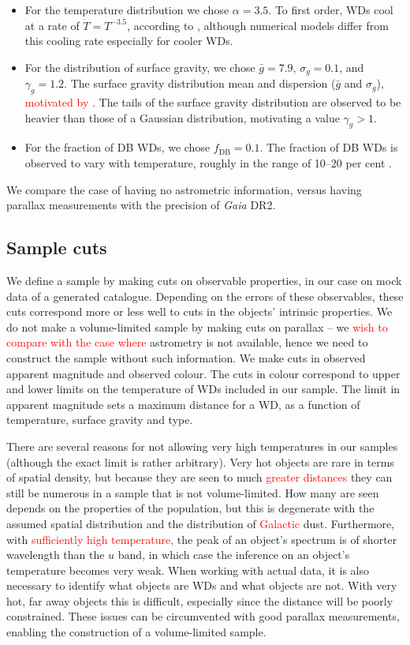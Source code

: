 \documentclass[fleqn,usenatbib]{mnras}
\newcommand{\changes}[1]{\textcolor{red}{#1}}
\newcommand{\Teff}{T}
\begin{document}
\begin{itemize}
	\item For the temperature distribution we chose $\alpha=3.5$. To first order, WDs cool at a rate of $\dot{\Teff} = \Teff^{-3.5}$, according to \cite{1952MNRAS.112..583M}, although numerical models differ from this cooling rate especially for cooler WDs.
	\item For the distribution of surface gravity, we chose $\bar{g}=7.9$, $\sigma_g=0.1$, and $\gamma_g=1.2$. The surface gravity distribution mean and dispersion ($\bar{g}$ and $\sigma_g$), \changes{motivated by} \cite{2006ApJS..167...40E}. The tails of the surface gravity distribution are observed to be heavier than those of a Gaussian distribution, motivating a value $\gamma_g>1$.
	\item For the fraction of DB WDs, we chose $f_\text{DB}=0.1$. The fraction of DB WDs is observed to vary with temperature, roughly in the range of 10--20 per cent \citep{2011ApJ...737...28B}.
\end{itemize}

We compare the case of having no astrometric information, versus having parallax measurements with the precision of \emph{Gaia} DR2.

\subsection{Sample cuts}\label{sec:sample_cuts}

We define a sample by making cuts on observable properties, in our case on mock data of a generated catalogue. Depending on the errors of these observables, these cuts correspond more or less well to cuts in the objects' intrinsic properties. We do not make a volume-limited sample by making cuts on parallax -- we \changes{wish to compare with the case where} astrometry is not available, hence we need to construct the sample without such information. We make cuts in observed apparent magnitude and observed colour. The cuts in colour correspond to upper and lower limits on the temperature of WDs included in our sample. The limit in apparent magnitude sets a maximum distance for a WD, as a function of temperature, surface gravity and type.

There are several reasons for not allowing very high temperatures in our samples (although the exact limit is rather arbitrary). Very hot objects are rare in terms of spatial density, but because they are seen to much \changes{greater distances} they can still be numerous in a sample that is not volume-limited. How many are seen depends on the properties of the population, but this is degenerate with the assumed spatial distribution and the distribution of \changes{Galactic} dust. Furthermore, with \changes{sufficiently high temperature,} the peak of an object's spectrum is of shorter wavelength than the $u$ band, in which case the inference on an object's temperature becomes very weak. When working with actual data, it is also necessary to identify what objects are WDs and what objects are not. With very hot, far away objects this is difficult, especially since the distance will be poorly constrained. These issues can be circumvented with good parallax measurements, enabling the construction of a volume-limited sample.
\end{document}
